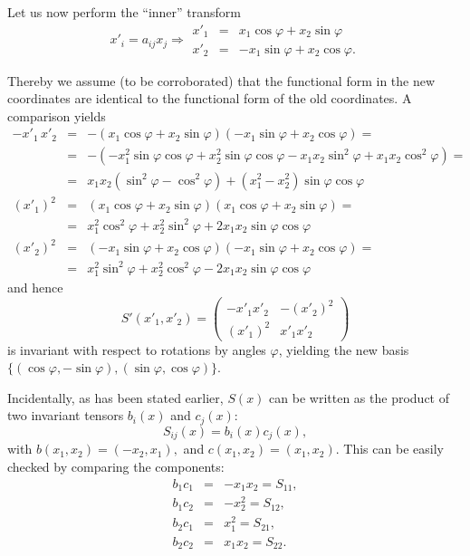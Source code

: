{Let us now perform the ``inner'' transform
$$
  x'_i =a_{ij}x_j \Longrightarrow
  \begin{array}{rcl}
    x'_1 & = & x_1 \cos \varphi + x_2 \sin \varphi \\
    x'_2 & = & -x_1 \sin \varphi + x_2 \cos \varphi .
  \end{array}
$$

Thereby we assume (to be corroborated) that the functional form in the new coordinates are identical
to the functional form of the old coordinates.
A comparison yields
\begin{eqnarray*}
  -x'_1 \,x'_2 & = &
  -\left(x_1 \cos \varphi + x_2 \sin \varphi \right)
  \left(-x_1 \sin \varphi + x_2 \cos \varphi \right) = \\
  & = &
  -\left(
    -x_1^2 \sin \varphi \cos \varphi +
      x_2^2 \sin \varphi \cos \varphi -
      x_1 x_2 \sin^2 \varphi + x_1 x_2 \cos^2 \varphi
  \right) = \\
  & = &
  x_1 x_2 \left(\sin^2 \varphi - \cos^2 \varphi \right) +
    \left(x_1^2 - x_2^2\right) \sin \varphi \cos \varphi \\
  (x'_1)^2  & = &
    \left(x_1 \cos \varphi + x_2 \sin \varphi \right)
    \left(x_1 \cos \varphi + x_2 \sin \varphi \right) = \\
  & = & x_1^2 \cos^2 \varphi + x_2^2 \sin^2 \varphi +
    2 x_1 x_2 \sin \varphi \cos \varphi \\
  (x'_2)^2  & = &
    \left(-x_1 \sin \varphi + x_2 \cos \varphi \right)
    \left(-x_1 \sin \varphi + x_2 \cos \varphi \right) = \\
  & = & x_1^2 \sin^2 \varphi + x_2^2 \cos^2 \varphi -
    2 x_1 x_2 \sin \varphi \cos \varphi
\end{eqnarray*}
and hence
$$S' (x'_1,x'_2)=\left(
    \begin{array}{cc}
      -x'_1x'_2 & -(x'_2)^2 \\
      (x'_1)^2   & x'_1x'_2
    \end{array}
\right)
$$ is invariant with respect to rotations by angles $\varphi$, yielding the new basis
$\{ (\cos \varphi ,-\sin \varphi
),(\sin
\varphi ,\cos \varphi )\}$.


Incidentally,
as has been stated earlier, $S(x)$ can be written as the product of two invariant tensors $b_i(x)$ and $c_j(x)$:
$$S_{ij}(x)=b_i(x)c_j(x),$$
with
$
b(x_1,x_2)=(-x_2,x_1),
$ and
$
c(x_1,x_2)=(x_1,x_2)
$.
This can be easily checked by comparing the components:
\begin{eqnarray*}
b_1c_1&=&-x_1x_2 = S_{11},\\
b_1c_2&=&-x_2^2 = S_{12},\\
b_2c_1&=&x_1^2 = S_{21},\\
b_2c_2&=&x_1x_2 = S_{22}.\\
\end{eqnarray*}

}
